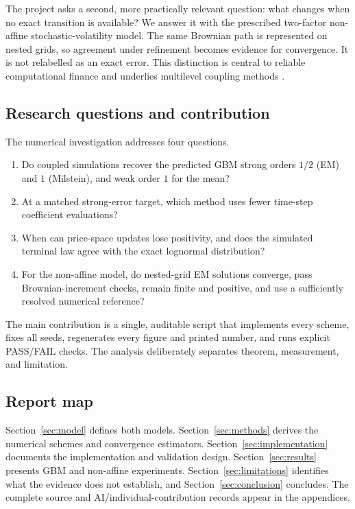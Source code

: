 \documentclass[11pt,a4paper]{article}
\theoremstyle{definition}
\theoremstyle{remark}
\begin{document}
The project asks a second, more practically relevant question: what changes
when no exact transition is available?  We answer it with the prescribed
two-factor non-affine stochastic-volatility model.  The same Brownian path is
represented on nested grids, so agreement under refinement becomes evidence
for convergence.  It is not relabelled as an exact error.  This distinction is
central to reliable computational finance and underlies multilevel coupling
methods \cite{giles2008}.

\subsection{Research questions and contribution}
The numerical investigation addresses four questions.
\begin{enumerate}[leftmargin=2.2em]
  \item Do coupled simulations recover the predicted GBM strong orders
  $1/2$ (EM) and $1$ (Milstein), and weak order $1$ for the mean?
  \item At a matched strong-error target, which method uses fewer time-step
  coefficient evaluations?
  \item When can price-space updates lose positivity, and does the simulated
  terminal law agree with the exact lognormal distribution?
  \item For the non-affine model, do nested-grid EM solutions converge, pass
  Brownian-increment checks, remain finite and positive, and use a sufficiently
  resolved numerical reference?
\end{enumerate}

The main contribution is a single, auditable script that implements every
scheme, fixes all seeds, regenerates every figure and printed number, and runs
explicit PASS/FAIL checks.  The analysis deliberately separates theorem,
measurement, and limitation.

\subsection{Report map}
Section~\ref{sec:model} defines both models.  Section~\ref{sec:methods} derives
the numerical schemes and convergence estimators.  Section~\ref{sec:implementation}
documents the implementation and validation design.  Section~\ref{sec:results}
presents GBM and non-affine experiments.  Section~\ref{sec:limitations}
identifies what the evidence does not establish, and Section~\ref{sec:conclusion}
concludes.  The complete source and AI/individual-contribution records appear
in the appendices.
\end{document}
